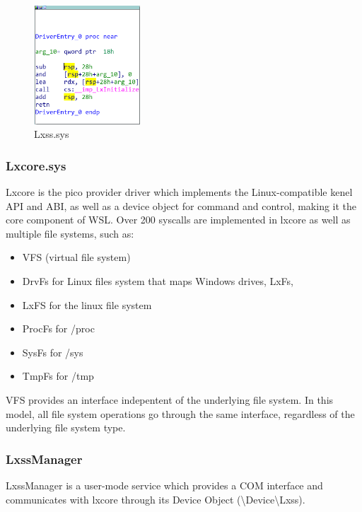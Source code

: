             \begin{figure}[H]
                \centering
                \includegraphics[width=150px, keepaspectratio]{img/lxss.png}
                \caption{Lxss.sys}
                \label{fig:lxss}
            \end{figure}
            
            \subsubsection{Lxcore.sys}
            Lxcore is the pico provider driver which implements the Linux-compatible kenel API and ABI, as well as a device object for command
            and control\cite{Bluehat2016AI}, making it the core component of WSL. Over 200 syscalls are implemented in lxcore as well as
            multiple file systems, such as:
            \begin{itemize}
                \item VFS (virtual file system)
                \item DrvFs for Linux files system that maps Windows drives, LxFs, 
                \item LxFS for the linux file system
                \item ProcFs for /proc
                \item SysFs for /sys
                \item TmpFs for /tmp
            \end{itemize}

            VFS provides an interface indepentent of the underlying file system. In this model, all file system operations go through the
            same interface, regardless of the underlying file system type\cite{TheArtOfMemoryForensics}.

            \subsubsection{LxssManager}
            LxssManager is a user-mode service which provides a COM interface and communicates with lxcore through its Device Object
            (\textbackslash Device\textbackslash Lxss).

